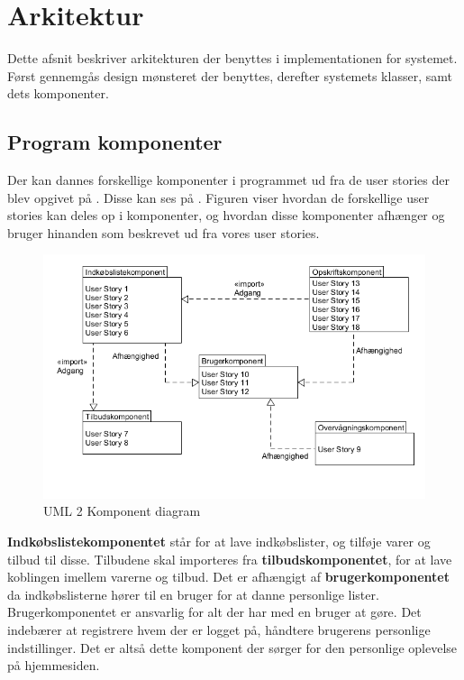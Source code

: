 \section{Arkitektur}
Dette afsnit beskriver arkitekturen der benyttes i implementationen for systemet.
Først gennemgås design mønsteret der benyttes, derefter systemets klasser, samt dets komponenter.




\subsection{Program komponenter}\label{subsec:komp}

Der kan dannes forskellige komponenter i programmet ud fra de user stories der blev opgivet på .
Disse kan ses på .
Figuren viser hvordan de forskellige user stories kan deles op i komponenter, og hvordan disse komponenter afhænger og bruger hinanden som beskrevet ud fra vores user stories.

\begin{figure}
	\vspace{-20pt}
	\begin{center}
		\includegraphics[scale=0.6]{images/Diagrams/Komponenter.png}
	\end{center}
	\vspace{-20pt}
	\caption{UML 2 Komponent diagram }
	\label{figure:komp}
	\vspace{-20pt}
\end{figure}

\textbf{Indkøbslistekomponentet} står for at lave indkøbslister, og tilføje varer og tilbud til disse.
Tilbudene skal importeres fra \textbf{tilbudskomponentet}, for at lave koblingen imellem varerne og tilbud.
Det er afhængigt af \textbf{brugerkomponentet} da indkøbslisterne hører til en bruger for at danne personlige lister. Brugerkomponentet er ansvarlig for alt der har med en bruger at gøre. Det indebærer at registrere hvem der er logget på, håndtere brugerens personlige indstillinger. Det er altså dette komponent der sørger for den personlige oplevelse på hjemmesiden.

